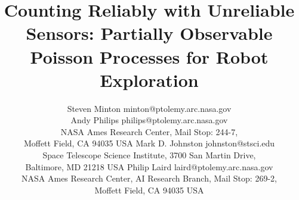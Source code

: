 \documentclass[twoside,11pt]{article}
\begin{document}
	
\newcommand{\tp}{\textrm{\textit{tp}}}
\newcommand{\fp}{\textrm{\textit{fp}}}
\newcommand{\tpr}{\textrm{\textit{tpr}}}
\newcommand{\fnr}{\textrm{\textit{fnr}}}
\newcommand{\fpr}{\textrm{\textit{fpr}}}
\newcommand{\tnr}{\textrm{\textit{tnr}}}
\newtheorem{definition2}[subsection]{Definition}	

\title{Counting Reliably with Unreliable Sensors: Partially Observable Poisson Processes for Robot Exploration}

\author{\name Steven Minton \email minton@ptolemy.arc.nasa.gov \\
       \name Andy Philips \email philips@ptolemy.arc.nasa.gov \\
       \addr NASA Ames Research Center, Mail Stop: 244-7,\\
       Moffett Field, CA  94035 USA
       \AND
       \name Mark D. Johnston \email johnston@stsci.edu \\
       \addr Space Telescope Science Institute,
       3700 San Martin Drive,\\
       Baltimore, MD 21218 USA
       \AND
       \name Philip Laird \email laird@ptolemy.arc.nasa.gov \\
       \addr NASA Ames Research Center,
       AI Research Branch, Mail Stop: 269-2,\\
       Moffett Field, CA  94035 USA}


\maketitle








% 










\vskip 0.2in


\end{document}
